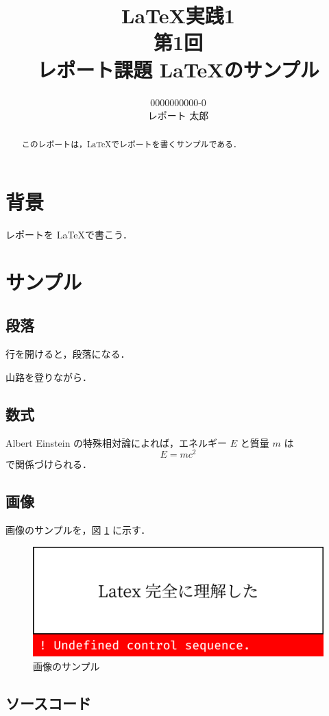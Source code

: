\documentclass[a4paper, 12pt, uplatex]{jsarticle}
\author{0000000000-0 \\ レポート 太郎}
\title{\LaTeX 実践1\\第1回\\レポート課題 \LaTeX のサンプル}
\date{}
\begin{document}
\maketitle

\begin{abstract}
  このレポートは，\LaTeX でレポートを書くサンプルである．
\end{abstract}

\section{背景}
レポートを \LaTeX で書こう．

\section{サンプル}

\subsection{段落}

行を開けると，段落になる．

山路を登りながら．

\subsection{数式}
Albert Einstein の特殊相対論によれば，エネルギー \(E\) と質量 \(m\) は
\[
  E = mc^{2}
\]
で関係づけられる．

\subsection{画像}


画像のサンプルを，図 \ref{fig:image} に示す．

\begin{figure}[ht]
  \begin{center}
    \includegraphics[width=0.4\linewidth]{image.png}
  \end{center}
  \caption{画像のサンプル}
  \label{fig:image}
\end{figure}

\subsection{ソースコード}
\end{document}
